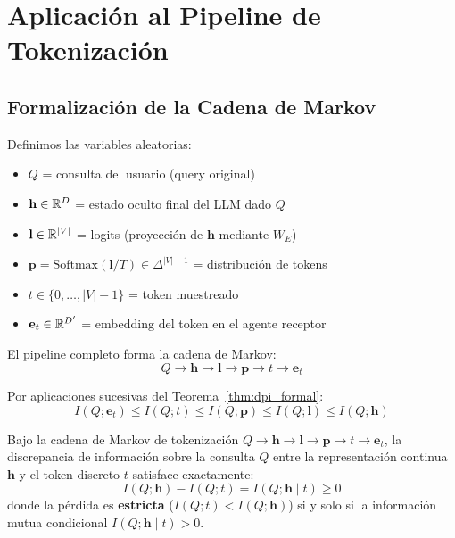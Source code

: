 \section{Aplicación al Pipeline de Tokenización}

\subsection{Formalización de la Cadena de Markov}

Definimos las variables aleatorias:
\begin{itemize}
\item $Q$ = consulta del usuario (query original)
\item $\mathbf{h} \in \mathbb{R}^D$ = estado oculto final del LLM dado $Q$
\item $\mathbf{l} \in \mathbb{R}^{|V|}$ = logits (proyección de $\mathbf{h}$ mediante $W_E$)
\item $\mathbf{p} = \text{Softmax}(\mathbf{l}/T) \in \Delta^{|V|-1}$ = distribución de tokens
\item $t \in \{0,\ldots,|V|-1\}$ = token muestreado
\item $\mathbf{e}_t \in \mathbb{R}^{D'}$ = embedding del token en el agente receptor
\end{itemize}

El pipeline completo forma la cadena de Markov:
\begin{equation}
Q \to \mathbf{h} \to \mathbf{l} \to \mathbf{p} \to t \to \mathbf{e}_t
\end{equation}

Por aplicaciones sucesivas del Teorema~\ref{thm:dpi_formal}:
\begin{equation}
I(Q; \mathbf{e}_t) \le I(Q; t) \le I(Q; \mathbf{p}) \le I(Q; \mathbf{l}) \le I(Q; \mathbf{h})
\label{eq:dpi_chain}
\end{equation}

\begin{corollary}
\label{cor:dpi_acumulada}
Bajo la cadena de Markov de tokenización $Q \to \mathbf{h} \to \mathbf{l} \to \mathbf{p} \to t \to \mathbf{e}_t$,
la discrepancia de información sobre la consulta $Q$ entre la representación continua $\mathbf{h}$
y el token discreto $t$ satisface exactamente:
\begin{equation}
I(Q; \mathbf{h}) - I(Q; t) = I(Q; \mathbf{h} \mid t) \ge 0
\end{equation}
donde la pérdida es \textbf{estricta} ($I(Q; t) < I(Q; \mathbf{h})$) si y solo si
la información mutua condicional $I(Q; \mathbf{h} \mid t) > 0$.
\end{corollary}

